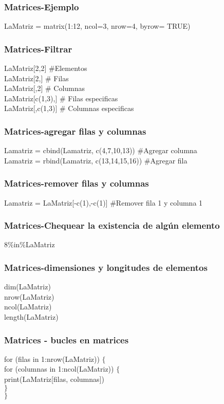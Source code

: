 \documentclass[14pt]{beamer}
\begin{document}
\begin{frame}
	\frametitle{Matrices-Ejemplo}
	LaMatriz = matrix(1:12, ncol=3, nrow=4, byrow= TRUE)
\end{frame}

\begin{frame}
	\frametitle{Matrices-Filtrar}
	LaMatriz[2,2] $\#$Elementos\\
	LaMatriz[2,]  $\#$ Filas\\
	LaMatriz[,2] $\#$ Columnas\\
	LaMatriz[c(1,3),] $\#$ Filas especificas\\
	LaMatriz[,c(1,3)] $\#$ Columnas especificas
	
\end{frame}

\begin{frame}
	\frametitle{Matrices-agregar filas y columnas}
	Lamatriz = cbind(Lamatriz, c(4,7,10,13)) $\#$Agregar columna\\
	Lamatriz = rbind(Lamatriz, c(13,14,15,16)) $\#$Agregar fila\\
	
\end{frame}

\begin{frame}
	\frametitle{Matrices-remover filas y columnas}
	Lamatriz = LaMatriz[-c(1),-c(1)] $\#$Remover fila 1  y columna 1\\
	
\end{frame}

\begin{frame}
	\frametitle{Matrices-Chequear la existencia de algún elemento}
	8\%in\%LaMatriz
\end{frame}

\begin{frame}
	\frametitle{Matrices-dimensiones y longitudes de elementos}
	dim(LaMatriz)\\
	nrow(LaMatriz)\\
	ncol(LaMatriz)\\
	length(LaMatriz)
\end{frame}

\begin{frame}
	\frametitle{Matrices - bucles en matrices}

 for (filas in 1:nrow(LaMatriz)) $\{$\\
	for (columnas in 1:ncol(LaMatriz)) $\{$\\
		print(LaMatriz[filas, columnas])\\
	$\}$\\
$\}$

\end{frame}
\end{document}
